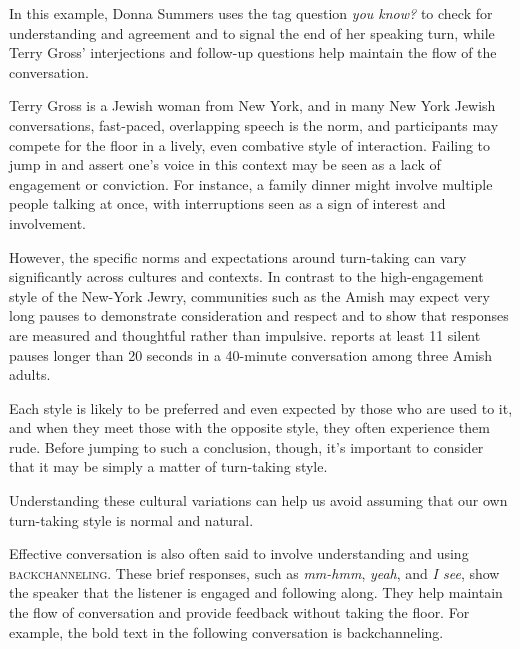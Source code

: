 In this example, Donna Summers uses the tag question \textit{you know?} to check for understanding and agreement and to signal the end of her speaking turn, while Terry Gross' interjections and follow-up questions help maintain the flow of the conversation.

Terry Gross is a Jewish woman from New York, and in many New York Jewish conversations, fast-paced, overlapping speech is the norm, and participants may compete for the floor in a lively, even combative style of interaction. Failing to jump in and assert one's voice in this context may be seen as a lack of engagement or conviction. For instance, a family dinner might involve multiple people talking at once, with interruptions seen as a sign of interest and involvement.

However, the specific norms and expectations around turn-taking can vary significantly across cultures and contexts. In contrast to the high-engagement style of the New-York Jewry, communities such as the Amish may expect very long pauses to demonstrate consideration and respect and to show that responses are measured and thoughtful rather than impulsive. \citet{Enninger1991} reports at least 11 silent pauses longer than 20 seconds in a 40-minute conversation among three Amish adults.

Each style is likely to be preferred and even expected by those who are used to it, and when they meet those with the opposite style, they often experience them rude. Before jumping to such a conclusion, though, it's important to consider that it may be simply a matter of turn-taking style.

Understanding these cultural variations can help us avoid assuming that our own turn-taking style is normal and natural.

Effective conversation is also often said to involve understanding and using \textsc{backchanneling}. These brief responses, such as \textit{mm-hmm}, \textit{yeah}, and \textit{I see}, show the speaker that the listener is engaged and following along. They help maintain the flow of conversation and provide feedback without taking the floor. For example, the bold text in the following conversation is backchanneling.

